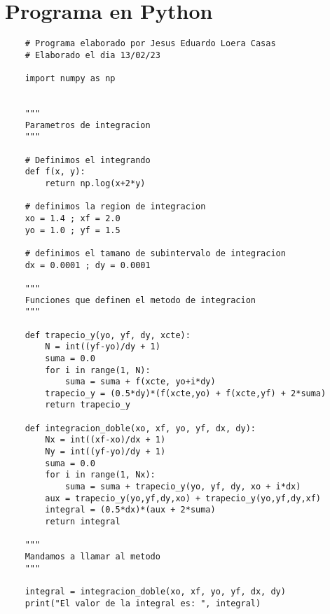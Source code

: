 \section{Programa en Python}


\begin{lstlisting}
    # Programa elaborado por Jesus Eduardo Loera Casas
    # Elaborado el dia 13/02/23
    
    import numpy as np


    """
    Parametros de integracion
    """

    # Definimos el integrando
    def f(x, y):
        return np.log(x+2*y)

    # definimos la region de integracion
    xo = 1.4 ; xf = 2.0
    yo = 1.0 ; yf = 1.5

    # definimos el tamano de subintervalo de integracion
    dx = 0.0001 ; dy = 0.0001

    """
    Funciones que definen el metodo de integracion
    """

    def trapecio_y(yo, yf, dy, xcte):
        N = int((yf-yo)/dy + 1)
        suma = 0.0
        for i in range(1, N):
            suma = suma + f(xcte, yo+i*dy)
        trapecio_y = (0.5*dy)*(f(xcte,yo) + f(xcte,yf) + 2*suma)
        return trapecio_y

    def integracion_doble(xo, xf, yo, yf, dx, dy):
        Nx = int((xf-xo)/dx + 1)
        Ny = int((yf-yo)/dy + 1)
        suma = 0.0
        for i in range(1, Nx):
            suma = suma + trapecio_y(yo, yf, dy, xo + i*dx)
        aux = trapecio_y(yo,yf,dy,xo) + trapecio_y(yo,yf,dy,xf)
        integral = (0.5*dx)*(aux + 2*suma)
        return integral

    """
    Mandamos a llamar al metodo
    """

    integral = integracion_doble(xo, xf, yo, yf, dx, dy)
    print("El valor de la integral es: ", integral)
\end{lstlisting}


 
